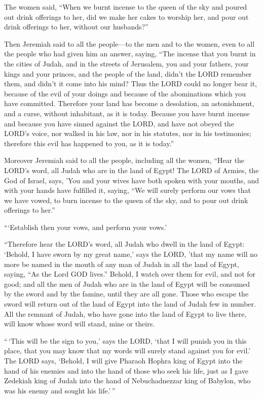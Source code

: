  The women said, ``When we burnt incense to the queen of
the sky and poured out drink offerings to her, did we make her cakes to
worship her, and pour out drink offerings to her, without our
husbands?''

 Then Jeremiah said to all the people---to the men and to
the women, even to all the people who had given him an answer, saying,
 ``The incense that you burnt in the cities of Judah, and
in the streets of Jerusalem, you and your fathers, your kings and your
princes, and the people of the land, didn't the LORD remember them, and
didn't it come into his mind?  Thus the LORD could no
longer bear it, because of the evil of your doings and because of the
abominations which you have committed. Therefore your land has become a
desolation, an astonishment, and a curse, without inhabitant, as it is
today.  Because you have burnt incense and because you have
sinned against the LORD, and have not obeyed the LORD's voice, nor
walked in his law, nor in his statutes, nor in his testimonies;
therefore this evil has happened to you, as it is today.''

 Moreover Jeremiah said to all the people, including all
the women, ``Hear the LORD's word, all Judah who are in the land of
Egypt!  The LORD of Armies, the God of Israel, says, 'You
and your wives have both spoken with your mouths, and with your hands
have fulfilled it, saying, ``We will surely perform our vows that we
have vowed, to burn incense to the queen of the sky, and to pour out
drink offerings to her.''

```Establish then your vows, and perform your vows.'

 ``Therefore hear the LORD's word, all Judah who dwell in
the land of Egypt: `Behold, I have sworn by my great name,' says the
LORD, 'that my name will no more be named in the mouth of any man of
Judah in all the land of Egypt, saying, ``As the Lord GOD lives.''
 Behold, I watch over them for evil, and not for good; and
all the men of Judah who are in the land of Egypt will be consumed by
the sword and by the famine, until they are all gone. 
Those who escape the sword will return out of the land of Egypt into the
land of Judah few in number. All the remnant of Judah, who have gone
into the land of Egypt to live there, will know whose word will stand,
mine or theirs.

 ``\,`This will be the sign to you,' says the LORD, `that I
will punish you in this place, that you may know that my words will
surely stand against you for evil.'  The LORD says,
`Behold, I will give Pharaoh Hophra king of Egypt into the hand of his
enemies and into the hand of those who seek his life, just as I gave
Zedekiah king of Judah into the hand of Nebuchadnezzar king of Babylon,
who was his enemy and sought his life.'\,''

